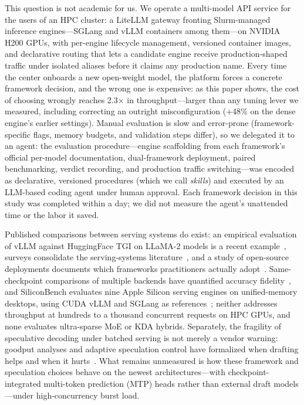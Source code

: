 \documentclass[11pt]{article}
\begin{document}
This question is not academic for us. We operate a multi-model API service for the users of an HPC cluster: a LiteLLM gateway fronting Slurm-managed inference engines---SGLang and vLLM containers among them---on NVIDIA H200 GPUs, with per-engine lifecycle management, versioned container images, and declarative routing that lets a candidate engine receive production-shaped traffic under isolated aliases before it claims any production name. Every time the center onboards a new open-weight model, the platform forces a concrete framework decision, and the wrong one is expensive: as this paper shows, the cost of choosing wrongly reaches 2.3$\times$ in throughput---larger than any tuning lever we measured, including correcting an outright misconfiguration (+48\% on the dense engine's earlier settings). Manual evaluation is slow and error-prone (framework-specific flags, memory budgets, and validation steps differ), so we delegated it to an agent: the evaluation procedure---engine scaffolding from each framework's official per-model documentation, dual-framework deployment, paired benchmarking, verdict recording, and production traffic switching---was encoded as declarative, versioned procedures (which we call \emph{skills}) and executed by an LLM-based coding agent under human approval. Each framework decision in this study was completed within a day; we did not measure the agent's unattended time or the labor it saved.

Published comparisons between serving systems do exist: an empirical evaluation of vLLM against HuggingFace TGI on LLaMA-2 models is a recent example~\cite{kolluru2025tgi}, surveys consolidate the serving-systems literature~\cite{li2024survey}, and a study of open-source deployments documents which frameworks practitioners actually adopt~\cite{majidi2026wild}. Same-checkpoint comparisons of multiple backends have quantified accuracy fidelity~\cite{pape2026silent}, and SiliconBench evaluates nine Apple Silicon serving engines on unified-memory desktops, using CUDA vLLM and SGLang as references~\cite{zhang2026siliconbench}; neither addresses throughput at hundreds to a thousand concurrent requests on HPC GPUs, and none evaluates ultra-sparse MoE or KDA hybrids. Separately, the fragility of speculative decoding under batched serving is not merely a vendor warning: goodput analyses and adaptive speculation control have formalized when drafting helps and when it hurts~\cite{liu2024turbospec,li2025adaserve}. What remains unmeasured is how these framework and speculation choices behave on the newest architectures---with checkpoint-integrated multi-token prediction (MTP) heads rather than external draft models---under high-concurrency burst load.
\end{document}
